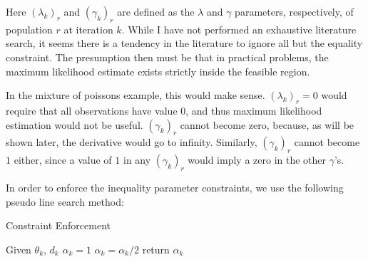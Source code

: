 \documentclass[letter,12pt]{article}
\begin{document}
Here $(\lambda_k)_r$ and $(\gamma_k)_r$ are defined as the $\lambda$ and $\gamma$ parameters, respectively, of population $r$ at iteration $k$.  While I have not performed an exhaustive literature search, it seems there is a tendency in the literature to ignore all but the equality constraint.  The presumption then must be that in practical problems, the maximum likelihood estimate exists strictly inside the feasible region.  

In the mixture of poissons example, this would make sense.  $(\lambda_k)_r=0$ would require that all observations have value $0$, and thus maximum likelihood estimation would not be useful.  $(\gamma_k)_r$ cannot become zero, because, as will be shown later, the derivative would go to infinity.  Similarly, $(\gamma_k)_r$ cannot become $1$ either, since a value of $1$ in any $(\gamma_k)_r$ would imply a zero in the other $\gamma$'s.

In order to enforce the inequality parameter constraints, we use the following pseudo line search method:
 

\begin{algorithm}
\caption{Constraint Enforcement}
\label{alg:constraint_enforecement}
\begin{algorithmic}[1]
\State Given $\theta_k$, $d_k$
\State $\alpha_k = 1$
\State $\alpha_k = \alpha_k / 2$
\EndWhile
\State return $\alpha_k$
\end{algorithmic}
\end{algorithm}
\end{document}
